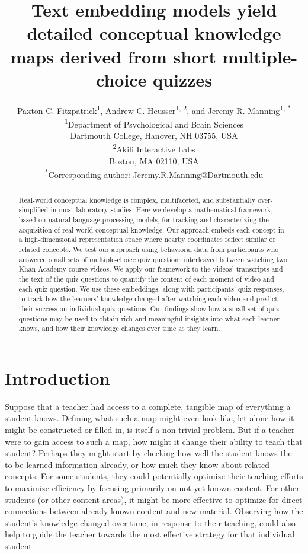 \documentclass[10pt]{article}
\title{Text embedding models yield detailed conceptual knowledge maps
derived from short multiple-choice quizzes}
\author{Paxton C. Fitzpatrick\textsuperscript{1}, Andrew C.
Heusser\textsuperscript{1, 2}, and Jeremy R. Manning\textsuperscript{1, *}\\
\vspace{-0.5em}\small{\textsuperscript{1}Department of Psychological and Brain
Sciences}\\
\small{Dartmouth College, Hanover, NH 03755, USA}\\
\vspace{-0.5em}\small{\textsuperscript{2}Akili Interactive Labs}\\
\small{Boston, MA 02110, USA}\\
\vspace{-0.5em}\small{\textsuperscript{*}Corresponding author:
Jeremy.R.Manning@Dartmouth.edu}}
\date{}
\begin{document}
\maketitle

\begin{abstract}\noindent Real-world conceptual knowledge is complex,
multifaceted, and substantially over-simplified in most laboratory studies.
Here we develop a mathematical framework, based on natural language processing
models, for tracking and characterizing the acquisition of real-world conceptual
knowledge. Our approach embeds each concept in a high-dimensional representation
space where nearby coordinates reflect similar or related concepts. We test our
approach using behavioral data from participants who answered small sets of
multiple-choice quiz questions interleaved between watching two Khan Academy
course videos. We apply our framework to the videos' transcripts and the text of
the quiz questions to quantify the content of each moment of video and each quiz
question. We use these embeddings, along with participants' quiz responses, to
track how the learners' knowledge changed after watching each video and predict
their success on individual quiz questions. Our findings show how a small set of
quiz questions may be used to obtain rich and meaningful insights into what each
learner knows, and how their knowledge changes over time as they learn.
\end{abstract}


\section*{Introduction}

Suppose that a teacher had access to a complete, tangible map of everything
a student knows. Defining what such a map might even look like, let alone how it
might be constructed or filled in, is itself a non-trivial problem. But if a
teacher were to gain access to such a map, how might it change their
ability to teach that student? Perhaps they might start by checking how well
the student knows the to-be-learned information already, or how much they know
about related concepts. For some students, they could potentially optimize
their teaching efforts to maximize efficiency by focusing primarily on
not-yet-known content. For other students (or other content areas), it might be
more effective to optimize for direct connections between already known content
and new material. Observing how the student's knowledge changed over time, in
response to their teaching, could also help to guide the teacher towards the
most effective strategy for that individual student.
\end{document}
